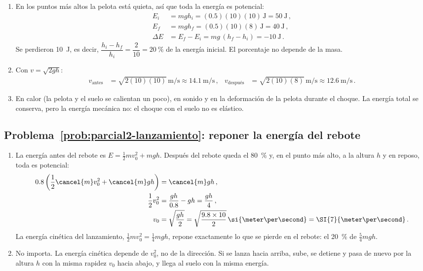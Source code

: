 \begin{enumerate}[label=\alph*)]
    \item En los puntos más altos la pelota está quieta, así que toda la
    energía es potencial:
    \begin{align}
        E_i &= mgh_i = (0.5)(10)(10)\,\si{\joule} = \SI{50}{\joule}\,, \nonumber\\
        E_f &= mgh_f = (0.5)(10)(8)\,\si{\joule} = \SI{40}{\joule}\,, \nonumber\\
        \Delta E &= E_f - E_i = mg\,(h_f - h_i) = \SI{-10}{\joule}\,.
    \end{align}
    Se perdieron \SI{10}{\joule}, es decir,
    $\dfrac{h_i - h_f}{h_i} = \dfrac{2}{10} = \SI{20}{\percent}$ de la
    energía inicial. El porcentaje no depende de la masa.
    \item Con $v = \sqrt{2gh}$:
    \begin{align}
        v_{\text{antes}} &= \sqrt{2(10)(10)}\,\si{\meter\per\second}
            \approx \SI{14.1}{\meter\per\second}\,, &
        v_{\text{después}} &= \sqrt{2(10)(8)}\,\si{\meter\per\second}
            \approx \SI{12.6}{\meter\per\second}\,.
    \end{align}
    \item En calor (la pelota y el suelo se calientan un poco), en sonido y
    en la deformación de la pelota durante el choque. La energía total se
    conserva, pero la energía mecánica no: el choque con el suelo no es
    elástico.
\end{enumerate}

\subsection*{Problema~\ref{prob:parcial2-lanzamiento}: reponer la energía del rebote}
\label{sol:parcial2-lanzamiento}

\begin{enumerate}[label=\alph*)]
    \item La energía antes del rebote es
    $E = \tfrac{1}{2}mv_0^2 + mgh$. Después del rebote queda el
    \SI{80}{\percent} y, en el punto más alto, a la altura $h$ y en reposo,
    toda es potencial:
    \begin{align}
        0.8\left(\frac{1}{2}\cancel{m}v_0^2 + \cancel{m}gh\right) &= \cancel{m}gh\,, \nonumber\\
        \frac{1}{2}v_0^2 &= \frac{gh}{0.8} - gh = \frac{gh}{4}\,, \nonumber\\
        v_0 &= \sqrt{\frac{gh}{2}} = \sqrt{\frac{9.8 \times 10}{2}}\,\si{\meter\per\second}
            = \SI{7}{\meter\per\second}\,.
    \end{align}
    La energía cinética del lanzamiento,
    $\tfrac{1}{2}mv_0^2 = \tfrac{1}{4}mgh$, repone exactamente lo que se
    pierde en el rebote: el \SI{20}{\percent} de $\tfrac{5}{4}mgh$.
    \item No importa. La energía cinética depende de $v_0^2$, no de la
    dirección. Si se lanza hacia arriba, sube, se detiene y pasa de nuevo por
    la altura $h$ con la misma rapidez $v_0$ hacia abajo, y llega al suelo con
    la misma energía.
\end{enumerate}

